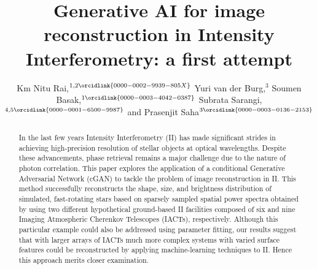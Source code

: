 \documentclass[twocolumn]{openjournal}
\begin{document}
\title{Generative AI for image reconstruction in Intensity Interferometry: a first attempt}
\date{}

\author{Km Nitu Rai,$^{1,2\orcidlink{0000-0002-9939-805X}}$ Yuri van der Burg,$^{3}$ Soumen Basak,$^{1\orcidlink{0000-0003-4042-0387}}$	Subrata Sarangi,$^{4,5\orcidlink{0000-0001-6500-9987}}$	and Prasenjit Saha$^{3\orcidlink{0000-0003-0136-2153}}$}






\begin{abstract}
	In the last few years Intensity Interferometry (II) has made significant strides in achieving high-precision resolution of stellar objects at optical wavelengths. Despite these advancements, phase retrieval remains a major challenge due to the nature of photon correlation. This paper explores the application of a conditional Generative Adversarial Network (cGAN) to tackle the problem of image reconstruction in II. This method successfully reconstructs the shape, size, and brightness distribution of simulated, fast-rotating stars based on sparsely sampled spatial power spectra obtained by using two different hypothetical ground-based II facilities composed of six and nine Imaging Atmospheric Cherenkov Telescopes (IACTs), respectively.  Although this particular example could also be addressed using parameter fitting, our results suggest that with larger arrays of IACTs much more complex systems with varied surface features could be reconstructed by applying machine-learning techniques to II. Hence this approach merits closer examination.
\end{abstract}

\maketitle
\end{document}
